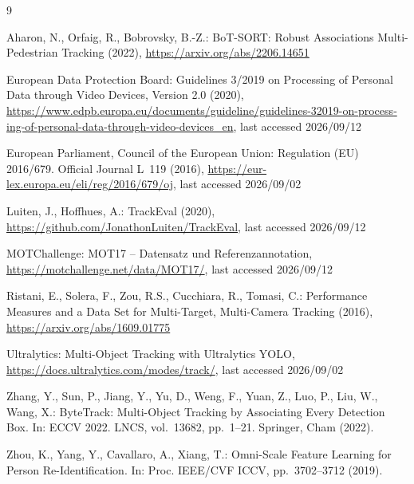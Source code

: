 \documentclass[runningheads]{llncs}
\begin{document}
\begin{otherlanguage}{english}
\renewcommand{\refname}{Literatur}
\begin{thebibliography}{9}

Aharon, N., Orfaig, R., Bobrovsky, B.-Z.: BoT-SORT: Robust Associations Multi-Pedestrian Tracking (2022), \url{https://arxiv.org/abs/2206.14651}

European Data Protection Board: Guidelines 3/2019 on Processing of Personal Data through Video Devices, Version 2.0 (2020), \url{https://www.edpb.europa.eu/documents/guideline/guidelines-32019-on-processing-of-personal-data-through-video-devices_en}, last accessed 2026/09/12

European Parliament, Council of the European Union: Regulation (EU) 2016/679. Official Journal L~119 (2016), \url{https://eur-lex.europa.eu/eli/reg/2016/679/oj}, last accessed 2026/09/02

Luiten, J., Hoffhues, A.: TrackEval (2020), \url{https://github.com/JonathonLuiten/TrackEval}, last accessed 2026/09/12

MOTChallenge: MOT17 -- Datensatz und Referenzannotation, \url{https://motchallenge.net/data/MOT17/}, last accessed 2026/09/12

Ristani, E., Solera, F., Zou, R.S., Cucchiara, R., Tomasi, C.: Performance Measures and a Data Set for Multi-Target, Multi-Camera Tracking (2016), \url{https://arxiv.org/abs/1609.01775}

Ultralytics: Multi-Object Tracking with Ultralytics YOLO, \url{https://docs.ultralytics.com/modes/track/}, last accessed 2026/09/02

Zhang, Y., Sun, P., Jiang, Y., Yu, D., Weng, F., Yuan, Z., Luo, P., Liu, W., Wang, X.: ByteTrack: Multi-Object Tracking by Associating Every Detection Box. In: ECCV 2022. LNCS, vol.~13682, pp.~1--21. Springer, Cham (2022). 

Zhou, K., Yang, Y., Cavallaro, A., Xiang, T.: Omni-Scale Feature Learning for Person Re-Identification. In: Proc. IEEE/CVF ICCV, pp.~3702--3712 (2019). 

\end{thebibliography}
\end{otherlanguage}
\end{document}
